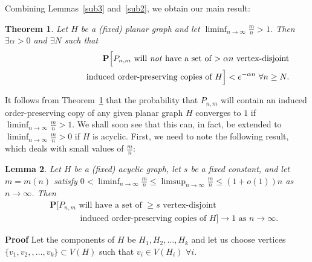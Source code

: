 \documentclass{article}
\newtheorem{Theorem}{Theorem}
\newtheorem{Lemma}[Theorem]{Lemma}
\newtheorem{Proof of Theorem}{Proof of Theorem}
\begin{document}
Combining Lemmas~\ref{sub3} and~\ref{sub2},
we obtain our main result:















\begin{Theorem} \label{sub4}
Let $H$ be a (fixed) planar graph and let $\liminf_{n \to \infty} \frac{m}{n} > 1$.
Then $\exists \alpha > 0$ and $\exists N$ such that
\begin{eqnarray*}
& & \mathbf{P}\Big[\textrm{$P_{n,m}$
will \emph{not} have a set of $> \alpha n$ vertex-disjoint} \\
& & \phantom{wwwwwwwwi}\textrm{induced order-preserving copies of $H$}\Big] 
< e^{- \alpha n} 
\textrm{ } \forall n \geq N. \\
\end{eqnarray*} 
\end{Theorem}
\phantom{p}















It follows from Theorem~\ref{sub4} that
the probability that $P_{n,m}$ will contain an induced order-preserving copy of any given planar graph $H$
converges to $1$ 
if~$\liminf_{n \to \infty}\frac{m}{n}>1$.
We shall soon see that this can, in fact, be extended to 
$\liminf_{n \to \infty} \frac{m}{n}>0$ if $H$ is acyclic.
First, we need to note the following result, which deals with small values of $\frac{m}{n}$:















\begin{Lemma} \label{sub5}
Let $H$ be a (fixed) acyclic graph,
let $s$ be a fixed constant, 
and let $m=m(n)$ satisfy
$0<\liminf_{n \to \infty}\frac{m}{n} \leq \limsup_{n \to \infty}\frac{m}{n} \leq (1+o(1))n$ 
as $n \to \infty$.
Then
\begin{eqnarray*}
& & \mathbf{P}\Big[\textrm{$P_{n,m}$ 
will have a set of $\geq s$ vertex-disjoint} \\
& & \phantom{wwwww}\textrm{induced order-preserving copies of $H$}\Big] 
\to 1
\textrm{ as } n \to \infty. 
\end{eqnarray*}
\end{Lemma}
\textbf{Proof}
Let the components of $H$ be $H_{1}, H_{2}, \ldots, H_{k}$
and let us choose vertices
$\{ v_{1}, v_{2}, , \ldots, v_{k} \} \subset V(H)$
such that $v_{i} \in V(H_{i})$ $\forall i$.
\end{document}
